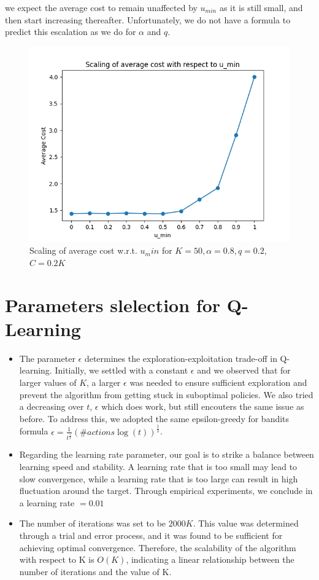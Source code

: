 \documentclass[12pt]{article}
\begin{document}
    we expect the average cost to remain unaffected by $u_{min}$ as it is still small, and then start increasing thereafter. Unfortunately, we do not have a formula to predict this escalation as we do for $\alpha$ and $q$.\begin{figure}[H]
        \centering
        \includegraphics[scale = 0.5]{Figure_33.png}
        \caption{Scaling of average cost w.r.t. $u_min$ for $K=50, \alpha = 0.8, q=0.2$, $C=0.2K$}
    \end{figure}
    \section*{Parameters slelection for Q-Learning}
    \begin{itemize}
        \item The parameter $\epsilon$ determines the exploration-exploitation trade-off in Q-learning.
        Initially, we settled with a constant $\epsilon$ and we observed that for larger values of $K$, a larger $\epsilon$ was needed to ensure sufficient exploration and prevent the algorithm from getting stuck in suboptimal policies. We also tried a decreasing over $t$, $\epsilon$ which does work, but still encouters the same issue as before.
        To address this, we adopted the same epsilon-greedy for bandits formula $\epsilon = \frac{1}{t^\frac{1}{3}}(\#actions \log(t))^\frac{1}{3}$.
        \item Regarding the learning rate parameter, our goal is to strike a balance between learning speed and stability. A learning rate that is too small may lead to slow convergence, while a learning rate that is too large can result in high fluctuation around the target.
         Through empirical experiments, we conclude in a learning rate $ = 0.01$
        \item The number of iterations was set to be $2000K$. This value was determined through a trial and error process, and it was found to be sufficient for achieving optimal convergence. Therefore, the scalability of the algorithm with respect to K is $O(K)$, indicating a linear relationship between the number of iterations and the value of K.
    \end{itemize}
\end{document}
